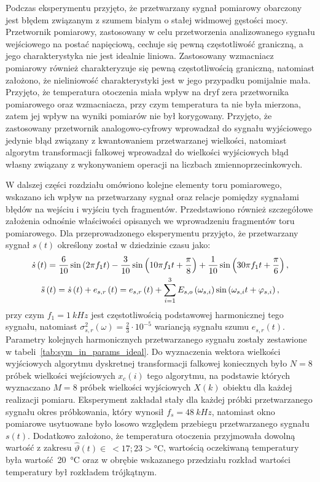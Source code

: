 Podczas eksperymentu przyjęto, że przetwarzany sygnał pomiarowy obarczony jest błędem związanym z szumem białym o stałej widmowej gęstości mocy. Przetwornik pomiarowy, zastosowany w celu przetworzenia analizowanego sygnału wejściowego na postać napięciową, cechuje się pewną częstotliwość graniczną, a jego charakterystyka nie jest idealnie liniowa. Zastosowany wzmacniacz pomiarowy również charakteryzuje się pewną częstotliwością graniczną, natomiast założono, że nieliniowość charakterystyki jest w jego przypadku pomijalnie mała. Przyjęto, że temperatura otoczenia miała wpływ na dryf zera przetwornika pomiarowego oraz wzmacniacza, przy czym temperatura ta nie była mierzona, zatem jej wpływ na wyniki pomiarów nie był korygowany. Przyjęto, że zastosowany przetwornik analogowo-cyfrowy wprowadzał do sygnału wyjściowego jedynie błąd związany z kwantowaniem przetwarzanej wielkości, natomiast algorytm transformacji falkowej wprowadzał do wielkości wyjściowych błąd własny związany z wykonywaniem operacji na liczbach zmiennoprzecinkowych.

W dalszej części rozdziału omówiono kolejne elementy toru pomiarowego, wskazano ich wpływ na przetwarzany sygnał oraz relacje pomiędzy sygnałami błędów na wejściu i wyjściu tych fragmentów. Przedstawiono również szczegółowe założenia odnośnie właściwości opisanych we wprowadzeniu fragmentów toru pomiarowego. Dla przeprowadzonego eksperymentu przyjęto, że przetwarzany sygnał $s(t)$ określony został w dziedzinie czasu jako:
\begin{gather}
\dot{s} \left(t\right) = \frac{6}{10} \sin \left( 2 \pi f_{1} t \right) - \frac{3}{10} \sin \left( 10 \pi f_{1} t + \frac{\pi}{8} \right) + \frac{1}{10} \sin \left( 30 \pi f_{1} t + \frac{\pi}{6} \right) \label{eq:sym_in_ideal}, \\
\tilde{s} \left(t\right) = \dot{s} \left(t\right) + e_{s,r} \left(t\right) = e_{s,r} \left(t\right) + \sum _{i=1} ^{3} E_{s,o} \left(\omega_{s,i}\right) \sin \left(\omega_{s,i} t + \varphi_{s,i}\right) \label{eq:sym_in_real},
\end{gather}
przy czym $f_{1} = \qty{1}{kHz}$ jest częstotliwością podstawowej harmonicznej tego sygnału, natomiast $\sigma_{s,r}^{2}(\omega) = \frac{2}{3} \cdot 10^{-5}$ wariancją sygnału szumu $e_{s,r}(t)$. Parametry kolejnych harmonicznych przetwarzanego sygnału zostały zestawione w tabeli~\ref{tab:sym_in_params_ideal}. Do wyznaczenia wektora wielkości wyjściowych algorytmu dyskretnej transformacji falkowej koniecznych było $N = 8$ próbek wielkości wejściowych $x_{c}(i)$ tego algorytmu, na podstawie których wyznaczano $M = 8$ próbek wielkości wyjściowych $X(k)$ obiektu dla każdej realizacji pomiaru. Eksperyment zakładał stały dla każdej próbki przetwarzanego sygnału okres próbkowania, który wynosił $f_{s} = \qty{48}{kHz}$, natomiast okno pomiarowe usytuowane było losowo względem przebiegu przetwarzanego sygnału $s(t)$. Dodatkowo założono, że temperatura otoczenia przyjmowała dowolną wartość z zakresu $\hat{\vartheta}(t)\in~<17;23>\unit{\degreeCelsius}$, wartością oczekiwaną temperatury była wartość~\qty{20}{\degreeCelsius} oraz w obrębie wskazanego przedziału rozkład wartości temperatury był rozkładem trójkątnym.

